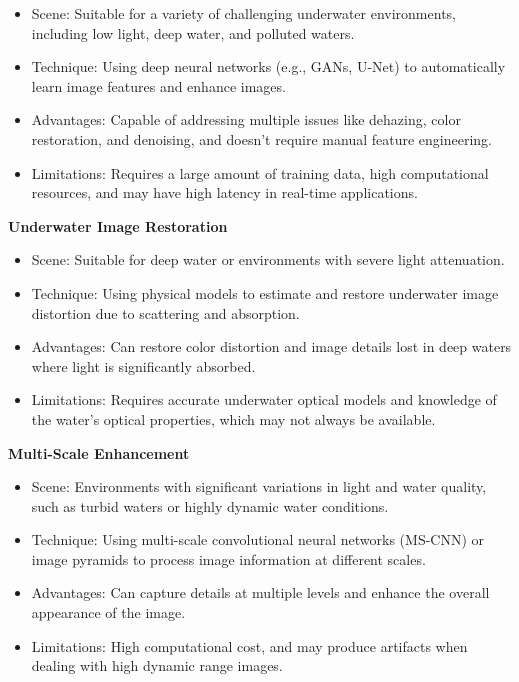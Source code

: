 \documentclass[withoutpreface,bwprint]{cumcmthesis}
\begin{document}
\begin{itemize}
    \item Scene: Suitable for a variety of challenging underwater environments, including low light, deep water, and polluted waters.

    \item Technique: Using deep neural networks (e.g., GANs, U-Net) to automatically learn image features and enhance images.

    \item Advantages: Capable of addressing multiple issues like dehazing, color restoration, and denoising, and doesn't require manual feature engineering.

    \item Limitations: Requires a large amount of training data, high computational resources, and may have high latency in real-time applications.
\end{itemize}

\textbf{Underwater Image Restoration}

\begin{itemize}
    \item Scene: Suitable for deep water or environments with severe light attenuation.

    \item Technique: Using physical models to estimate and restore underwater image distortion due to scattering and absorption.

    \item Advantages: Can restore color distortion and image details lost in deep waters where light is significantly absorbed.
    
    \item Limitations: Requires accurate underwater optical models and knowledge of the water's optical properties, which may not always be available.
\end{itemize}

\textbf{Multi-Scale Enhancement}

\begin{itemize}
    \item Scene: Environments with significant variations in light and water quality, such as turbid waters or highly dynamic water conditions.

    \item Technique: Using multi-scale convolutional neural networks (MS-CNN) or image pyramids to process image information at different scales.

    \item Advantages: Can capture details at multiple levels and enhance the overall appearance of the image.
    
    \item Limitations: High computational cost, and may produce artifacts when dealing with high dynamic range images.
\end{itemize}
\end{document}
